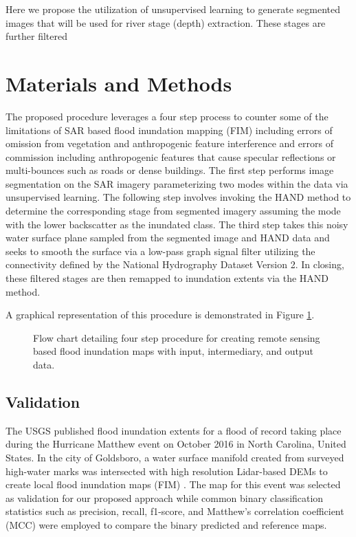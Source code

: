 \documentclass{article}
\begin{document}
Here we propose the utilization of unsupervised learning to generate segmented images that will be used for river stage (depth) extraction. These stages are further filtered


\section{Materials and Methods}
\label{sec:materials_and_methods}

The proposed procedure leverages a four step process to counter some of the limitations of SAR based flood inundation mapping (FIM) including errors of omission from vegetation and anthropogenic feature interference and errors of commission including anthropogenic features that cause specular reflections or multi-bounces such as roads or dense buildings.
The first step performs image segmentation on the SAR imagery parameterizing two modes within the data via unsupervised learning.
The following step involves invoking the HAND method to determine the corresponding stage from segmented imagery assuming the mode with the lower backscatter as the inundated class.
The third step takes this noisy water surface plane sampled from the segmented image and HAND data and seeks to smooth the surface via a low-pass graph signal filter utilizing the connectivity defined by the National Hydrography Dataset Version 2.
In closing, these filtered stages are then remapped to inundation extents via the HAND method.

A graphical representation of this procedure is demonstrated in Figure \ref{fig:process_flowchart}.

\begin{figure}[htb]

\begin{minipage}[b]{1.0\linewidth}
  \centering
 \centerline{}
\end{minipage}

\caption{Flow chart detailing four step procedure for creating remote sensing based flood inundation maps with input, intermediary, and output data.}
\label{fig:process_flowchart}

\end{figure}

\subsection{Validation}
\label{ssec:validation}

The USGS published flood inundation extents for a flood of record taking place during the Hurricane Matthew event on October 2016 in North Carolina, United States. 
In the city of Goldsboro, a water surface manifold created from surveyed high-water marks was intersected with high resolution Lidar-based DEMs to create local flood inundation maps (FIM) \cite{musser2017characterization}.
The map for this event was selected as validation for our proposed approach while common binary classification statistics such as precision, recall, f1-score, and Matthew's correlation coefficient (MCC) \cite{canbek2017binary,chicco2020advantages,matthews1975comparison,baldi2000assessing} were employed to compare the binary predicted and reference maps.
\end{document}
